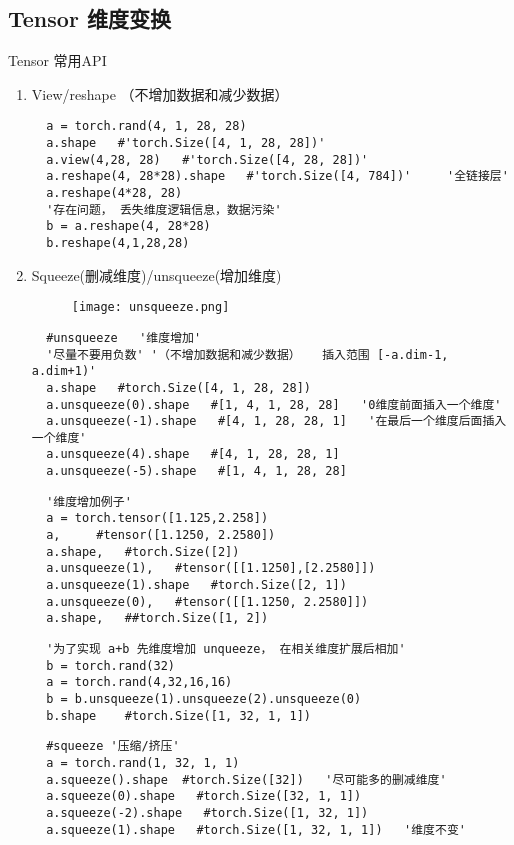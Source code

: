 \subsection{Tensor 维度变换}
Tensor 常用API
\begin{enumerate}
  \item View/reshape （不增加数据和减少数据）
  \begin{lstlisting}
  a = torch.rand(4, 1, 28, 28)
  a.shape   #'torch.Size([4, 1, 28, 28])'
  a.view(4,28, 28)   #'torch.Size([4, 28, 28])'
  a.reshape(4, 28*28).shape   #'torch.Size([4, 784])'     '全链接层'
  a.reshape(4*28, 28)
  '存在问题， 丢失维度逻辑信息，数据污染'
  b = a.reshape(4, 28*28)
  b.reshape(4,1,28,28)
  \end{lstlisting}

  \item Squeeze(删减维度)/unsqueeze(增加维度)
\begin{figure}[!h]
  \centering
  \texttt{[image: unsqueeze.png]}
\end{figure}
  \begin{lstlisting}
  #unsqueeze   '维度增加'
  '尽量不要用负数' '（不增加数据和减少数据）   插入范围 [-a.dim-1, a.dim+1)'
  a.shape   #torch.Size([4, 1, 28, 28])
  a.unsqueeze(0).shape   #[1, 4, 1, 28, 28]   '0维度前面插入一个维度'
  a.unsqueeze(-1).shape   #[4, 1, 28, 28, 1]   '在最后一个维度后面插入一个维度'
  a.unsqueeze(4).shape   #[4, 1, 28, 28, 1]
  a.unsqueeze(-5).shape   #[1, 4, 1, 28, 28]
  \end{lstlisting}
  \begin{lstlisting}
  '维度增加例子'
  a = torch.tensor([1.125,2.258])
  a,     #tensor([1.1250, 2.2580])
  a.shape,   #torch.Size([2])
  a.unsqueeze(1),   #tensor([[1.1250],[2.2580]])
  a.unsqueeze(1).shape   #torch.Size([2, 1])
  a.unsqueeze(0),   #tensor([[1.1250, 2.2580]])
  a.shape,   ##torch.Size([1, 2])
  \end{lstlisting}
  \begin{lstlisting}
  '为了实现 a+b 先维度增加 unqueeze， 在相关维度扩展后相加'
  b = torch.rand(32)
  a = torch.rand(4,32,16,16)
  b = b.unsqueeze(1).unsqueeze(2).unsqueeze(0)
  b.shape    #torch.Size([1, 32, 1, 1])
  \end{lstlisting}
  \begin{lstlisting}
  #squeeze '压缩/挤压'
  a = torch.rand(1, 32, 1, 1)
  a.squeeze().shape  #torch.Size([32])   '尽可能多的删减维度'
  a.squeeze(0).shape   #torch.Size([32, 1, 1])
  a.squeeze(-2).shape   #torch.Size([1, 32, 1])
  a.squeeze(1).shape   #torch.Size([1, 32, 1, 1])   '维度不变'
  \end{lstlisting}


\end{enumerate}
